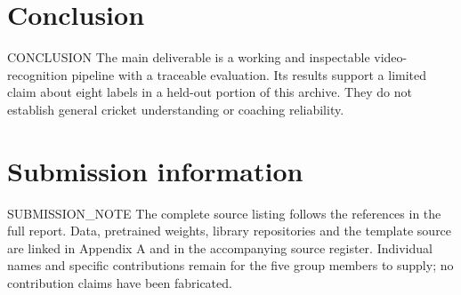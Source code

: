 \section{Conclusion}
{{CONCLUSION}} The main deliverable is a working and inspectable video-recognition pipeline with a traceable evaluation. Its results support a limited claim about eight labels in a held-out portion of this archive. They do not establish general cricket understanding or coaching reliability.

\section*{Submission information}
{{SUBMISSION_NOTE}}
The complete source listing follows the references in the full report. Data, pretrained weights, library repositories and the template source are linked in Appendix A and in the accompanying source register. Individual names and specific contributions remain for the five group members to supply; no contribution claims have been fabricated.
